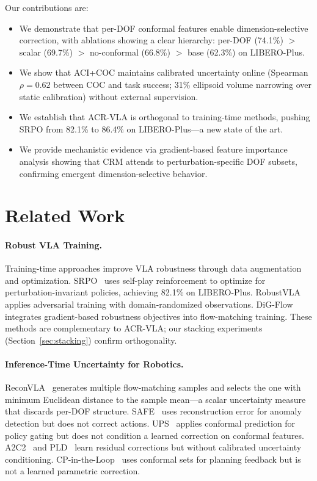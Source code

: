 \documentclass[10pt,letterpaper]{article}
\newcommand{\ours}{ACR-VLA}
\newcommand{\crm}{CRM}
\newcommand{\aci}{ACI}
\newcommand{\coc}{COC}
\begin{document}
Our contributions are:
\begin{itemize}
    \item We demonstrate that per-DOF conformal features enable dimension-selective correction, with ablations showing a clear hierarchy: per-DOF (74.1\%) $>$ scalar (69.7\%) $>$ no-conformal (66.8\%) $>$ base (62.3\%) on LIBERO-Plus.
    \item We show that \aci{}+\coc{} maintains calibrated uncertainty online (Spearman $\rho{=}0.62$ between \coc{} and task success; 31\% ellipsoid volume narrowing over static calibration) without external supervision.
    \item We establish that \ours{} is orthogonal to training-time methods, pushing SRPO from 82.1\% to 86.4\% on LIBERO-Plus---a new state of the art.
    \item We provide mechanistic evidence via gradient-based feature importance analysis showing that \crm{} attends to perturbation-specific DOF subsets, confirming emergent dimension-selective behavior.
\end{itemize}

\section{Related Work}
\label{sec:related}

\paragraph{Robust VLA Training.}
Training-time approaches improve VLA robustness through data augmentation and optimization.
SRPO~\cite{SRPO} uses self-play reinforcement to optimize for perturbation-invariant policies, achieving 82.1\% on LIBERO-Plus.
RobustVLA~\cite{RobustVLA} applies adversarial training with domain-randomized observations.
DiG-Flow~\cite{digflow} integrates gradient-based robustness objectives into flow-matching training.
These methods are complementary to \ours{}; our stacking experiments (Section~\ref{sec:stacking}) confirm orthogonality.

\paragraph{Inference-Time Uncertainty for Robotics.}
ReconVLA~\cite{reconvla} generates multiple flow-matching samples and selects the one with minimum Euclidean distance to the sample mean---a scalar uncertainty measure that discards per-DOF structure.
SAFE~\cite{SAFE} uses reconstruction error for anomaly detection but does not correct actions.
UPS~\cite{UPS} applies conformal prediction for policy gating but does not condition a learned correction on conformal features.
A2C2~\cite{A2C2} and PLD~\cite{PLD} learn residual corrections but without calibrated uncertainty conditioning.
CP-in-the-Loop~\cite{cploop} uses conformal sets for planning feedback but is not a learned parametric correction.
\end{document}
